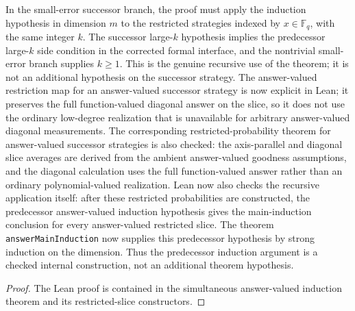 \begin{proposition}\label{prop:main-induction-successor-predecessor-induction}
	\leanok
	In the small-error successor branch, the proof must apply the induction
	hypothesis in dimension \(m\) to the restricted strategies indexed by
	\(x\in\mathbb F_q\), with the same integer \(k\).  The successor large-\(k\)
	hypothesis implies the predecessor large-\(k\) side condition in the corrected
	formal interface, and the nontrivial small-error branch supplies \(k\ge1\).
	This is the genuine recursive use of the theorem; it is not an additional
	hypothesis on the successor strategy.  The answer-valued restriction map for
	an answer-valued successor strategy is now explicit in Lean; it preserves the
	full function-valued diagonal answer on the slice, so it does not use the
	ordinary low-degree realization that is unavailable for arbitrary
	answer-valued diagonal measurements.  The corresponding restricted-probability
	theorem for answer-valued successor strategies is also checked: the
	axis-parallel and diagonal slice averages are derived from the ambient
	answer-valued goodness assumptions, and the diagonal calculation uses the
	full function-valued answer rather than an ordinary polynomial-valued
	realization.  Lean now also checks the recursive application itself: after
	these restricted probabilities are constructed, the predecessor
	answer-valued induction hypothesis gives the main-induction conclusion for
	every answer-valued restricted slice.  The theorem
	\texttt{answerMainInduction} now supplies this predecessor hypothesis by
	strong induction on the dimension.  Thus the predecessor induction argument
	is a checked internal construction, not an additional theorem hypothesis.
\end{proposition}
\begin{proof}
	\leanok
	The Lean proof is contained in the simultaneous answer-valued induction
	theorem and its restricted-slice constructors.
\end{proof}

